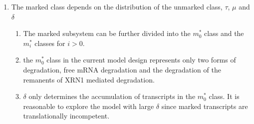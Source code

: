 \documentclass[review]{elsarticle}
\begin{document}
\begin{enumerate}
	\item The marked class depends on the distribution of the unmarked class, $\tau$, $\mu$ and $\delta$
	\begin{enumerate}
		\item The marked subsystem can be further divided into the $m_0^*$ class and the $m_i^*$ classes for $i>0$.
		\item the $m_0^*$  class in the current model design represents only two forms of degradation, free mRNA degradation and the degradation of the remanents of XRN1 mediated degradation.%
		\item  $\delta$ only determines the accumulation of transcripts in the  $m_0^*$  class. It is reasonable to explore the model with   large $\delta$ since marked transcripts are translationally incompetent. %

		
	\end{enumerate}
\end{enumerate}
		
\end{document}
